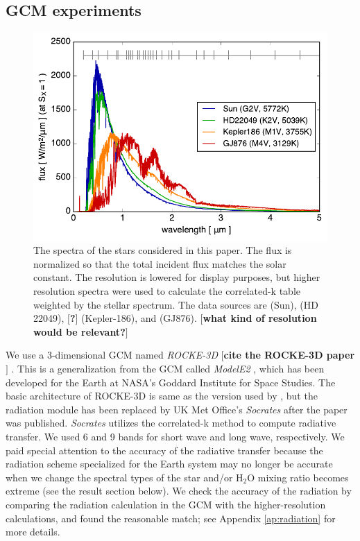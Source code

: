 \documentclass[11pt,numberedappendix,twocolappendix,]{emulateapj}
\def\water{H$_2$O }
\def\memo#1{\color{red}$[${\bf #1}$]$ \color{black}}
\begin{document}
\subsection{GCM experiments}

\begin{figure}[!bh]
    \begin{center}
    \includegraphics[width=\hsize]{fig/star_spectra.pdf}
    \end{center}
\caption{The spectra of the stars considered in this paper. The flux is normalized so that the total incident flux matches the solar constant. The resolution is lowered for display purposes, but higher resolution spectra were used to calculate the correlated-k table weighted by the stellar spectrum. The data sources are \citet{Kurucz1995} (Sun), \citet{Segura2003} (HD 22049), \memo{?} (Kepler-186), and \citet{Domagal-Goldman2014} (GJ876). \memo{what kind of resolution would be relevant?}}
\label{fig:star_spectra}
\end{figure}

We use a 3-dimensional GCM named {\it ROCKE-3D} \citep{way2016,ROCKE3D} \memo{cite  the ROCKE-3D paper}. 
This is a generalization from the GCM called {\it ModelE2} \citep{Schmidt2014}, which has been developed for the Earth at NASA's Goddard Institute for Space Studies. 
The basic architecture of ROCKE-3D is same as the version used by \citet{way2016}, but the radiation module has been replaced by UK Met Office's {\it Socrates} \citep{Edwards1996} after the paper was published. 
{\it Socrates} utilizes the correlated-k method to compute radiative transfer. 
We used 6 and 9 bands for short wave and long wave, respectively. 
We paid special attention to the accuracy of the radiative transfer because the radiation scheme specialized for the Earth system may no longer be accurate when we change the spectral types of the star and/or \water mixing ratio becomes extreme (see the result section below). 
We check the accuracy of the radiation by comparing the radiation calculation in the GCM with the higher-resolution calculations, and found the reasonable match;  see Appendix \ref{ap:radiation} for more details. 
\end{document}
